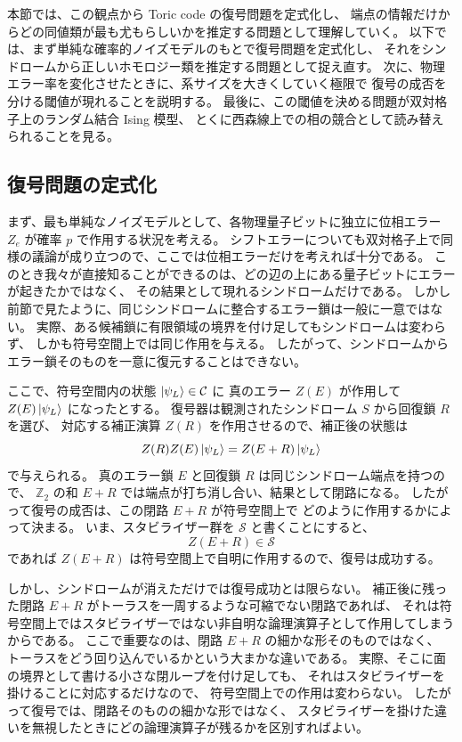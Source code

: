 \documentclass[../master.tex]{subfiles}
\begin{document}
本節では、この観点から Toric code の復号問題を定式化し、
端点の情報だけからどの同値類が最も尤もらしいかを推定する問題として理解していく。
以下では、まず単純な確率的ノイズモデルのもとで復号問題を定式化し、
それをシンドロームから正しいホモロジー類を推定する問題として捉え直す。
次に、物理エラー率を変化させたときに、系サイズを大きくしていく極限で
復号の成否を分ける閾値が現れることを説明する。
最後に、この閾値を決める問題が双対格子上のランダム結合 Ising 模型、
とくに西森線上での相の競合として読み替えられることを見る。

\subsection*{復号問題の定式化}

まず、最も単純なノイズモデルとして、各物理量子ビットに独立に位相エラー \(Z_e\) が確率 \(p\) で作用する状況を考える。
シフトエラーについても双対格子上で同様の議論が成り立つので、ここでは位相エラーだけを考えれば十分である。
このとき我々が直接知ることができるのは、どの辺の上にある量子ビットにエラーが起きたかではなく、
その結果として現れるシンドロームだけである。
しかし前節で見たように、同じシンドロームに整合するエラー鎖は一般に一意ではない。
実際、ある候補鎖に有限領域の境界を付け足してもシンドロームは変わらず、
しかも符号空間上では同じ作用を与える。
したがって、シンドロームからエラー鎖そのものを一意に復元することはできない。

ここで、符号空間内の状態 \(\ket{\psi_L}\in\mathcal C\) に
真のエラー \(Z(E)\) が作用して \(Z(E)\ket{\psi_L}\) になったとする。
復号器は観測されたシンドローム \(S\) から回復鎖 \(R\) を選び、
対応する補正演算 \(Z(R)\) を作用させるので、補正後の状態は
\begin{equation}
    Z(R)Z(E)\ket{\psi_L}=Z(E+R)\ket{\psi_L}
\end{equation}
で与えられる。
真のエラー鎖 \(E\) と回復鎖 \(R\) は同じシンドローム端点を持つので、
\(\mathbb Z_2\) の和 \(E+R\) では端点が打ち消し合い、結果として閉路になる。
したがって復号の成否は、この閉路 \(E+R\) が符号空間上で
どのように作用するかによって決まる。
いま、スタビライザー群を \(\mathcal S\) と書くことにすると、
\begin{equation}
    Z(E+R)\in\mathcal S
\end{equation}
であれば \(Z(E+R)\) は符号空間上で自明に作用するので、復号は成功する。

しかし、シンドロームが消えただけでは復号成功とは限らない。
補正後に残った閉路 \(E+R\) がトーラスを一周するような可縮でない閉路であれば、
それは符号空間上ではスタビライザーではない非自明な論理演算子として作用してしまうからである。
ここで重要なのは、閉路 \(E+R\) の細かな形そのものではなく、
トーラスをどう回り込んでいるかという大まかな違いである。
実際、そこに面の境界として書ける小さな閉ループを付け足しても、
それはスタビライザーを掛けることに対応するだけなので、
符号空間上での作用は変わらない。
したがって復号では、閉路そのものの細かな形ではなく、
スタビライザーを掛けた違いを無視したときにどの論理演算子が残るかを区別すればよい。
\end{document}
